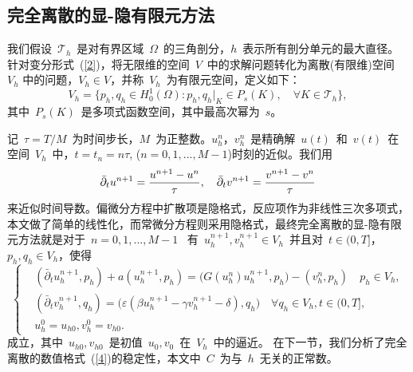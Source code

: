 \documentclass[twoside,UTF8]{nputhesis}
\begin{document}
\subsection{完全离散的显-隐有限元方法}
我们假设~$\mathcal {T}_h$~是对有界区域~$\Omega$~的三角剖分，$h$~表示所有剖分单元的最大直径。针对变分形式~(\ref{2})，将无限维的空间~$V$~中的求解问题转化为离散(有限维)空间~$V_h$ 中的问题，$V_h\in V$，并称~$V_h$~为有限元空间，定义如下：
\begin{equation*}
V_h=\{p_h,q_h\in H_0^1(\Omega):p_h,q_h|_K\in P_s(K),\quad\forall K\in \mathcal {T}_h\},
\label{hs}
\end{equation*}
其中~$P_s(K)$~是多项式函数空间，其中最高次幂为~$s$。

记~$\tau=T/M$~为时间步长，$M$~为正整数。$u^n_h$，$v^n_h$~是精确解~$u(t)$~和~$v(t)$~在空间~$V_h$~中，$t=t_{n}=n\tau$, ($n=0,1,...,M-1$)时刻的近似。我们用
\begin{equation*}
\bar{\partial}_tu^{n+1}=\frac{u^{n+1}-u^n}{\tau},\quad\bar{\partial}_tv^{n+1}\\=\frac{v^{n+1}-v^n}{\tau}
\end{equation*}
来近似时间导数。偏微分方程中扩散项是隐格式，反应项作为非线性三次多项式，本文做了简单的线性化，而常微分方程则采用隐格式，最终完全离散的显-隐有限元方法就是对于~$n=0,1,...,M-1$~ 有~$u^{n+1}_h,v^{n+1}_h\in V_h$~并且对~$t\in (0,T]$，$p_h,q_h\in V_h$，使得
\begin{equation}
\left\{\begin{aligned}&(\bar{\partial}_tu^{n+1}_h,p_h)+a(u^{n+1}_h,p_h)=\big(G(u^n_h)u_h^{n+1},p_h\big)-(v_h^n,p_h)\quad p_h\in V_h,\\&(\bar{\partial}_tv^{n+1}_h,q_h)=\big(\varepsilon(\beta u^{n+1}_h-\gamma v^{n+1}_h-\delta),q_h\big)\quad \forall q_h\in V_h,t\in(0,T],\\&u^0_h=u_{h0},v^0_h=v_{h0}.\end{aligned}\right.
\label{4}
\end{equation}
成立，其中~$u_{h0},v_{h0}$~是初值~$u_0,v_0$~在~$V_h$~中的逼近。
在下一节，我们分析了完全离散的数值格式~(\ref{4})的稳定性，本文中~$C$~为与~$h$~无关的正常数。
\newpage
\end{document}
